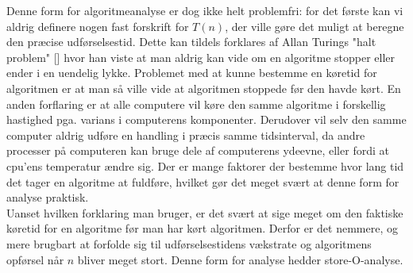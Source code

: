Denne form for algoritmeanalyse er dog ikke helt problemfri: for det første kan vi aldrig definere nogen fast forskrift for $T(n)$, der ville gøre det muligt at beregne den præcise udførselsestid. Dette kan tildels forklares af Allan Turings "halt problem" [] hvor han viste at man aldrig kan vide om en algoritme stopper eller ender i en uendelig lykke. Problemet med at kunne bestemme en køretid for algoritmen er at man så ville vide at algoritmen stoppede før den havde kørt. En anden forflaring er at alle computere vil køre den samme algoritme i forskellig hastighed pga. varians i computerens komponenter. Derudover vil selv den samme computer aldrig udføre en handling i præcis samme tidsinterval, da andre processer på computeren kan bruge dele af computerens ydeevne, eller fordi at cpu'ens temperatur ændre sig. Der er mange faktorer der bestemme hvor lang tid det tager en algoritme at fuldføre, hvilket gør det meget svært at denne form for analyse praktisk.\\

Uanset hvilken forklaring man bruger, er det svært at sige meget om den faktiske køretid for en algoritme før man har kørt algoritmen. Derfor er det nemmere, og mere brugbart at forfolde sig til udførselsestidens vækstrate og algoritmens opførsel når $n$ bliver meget stort. Denne form for analyse hedder store-O-analyse.

\section{}
\label{sec:Store-O-Analyse}

